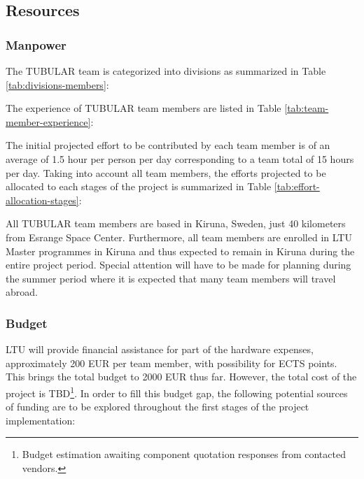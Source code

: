 \subsection{Resources}

\subsubsection{Manpower}
The TUBULAR team is categorized into divisions as summarized in Table \ref{tab:divisions-members}:



The experience of TUBULAR team members are listed in Table \ref{tab:team-member-experience}:



The initial projected effort to be contributed by each team member is of an average of 1.5 hour per person per day corresponding to a team total of 15 hours per day. Taking into account all team members, the efforts projected to be allocated to each stages of the project is summarized in Table \ref{tab:effort-allocation-stages}:



All TUBULAR team members are based in Kiruna, Sweden, just 40 kilometers from Esrange Space Center. Furthermore, all team members are enrolled in LTU Master programmes in Kiruna and thus expected to remain in Kiruna during the entire project period. Special attention will have to be made for planning during the summer period where it is expected that many team members will travel abroad. 

\subsubsection{Budget}
LTU will provide financial assistance for part of the hardware expenses, approximately 200 EUR per team member, with possibility for ECTS points. This brings the total budget to 2000 EUR thus far. However, the total cost of the project is TBD\footnote{Budget estimation awaiting component quotation responses from contacted vendors.}. In order to fill this budget gap, the following potential sources of funding are to be explored throughout the first stages of the project implementation:

